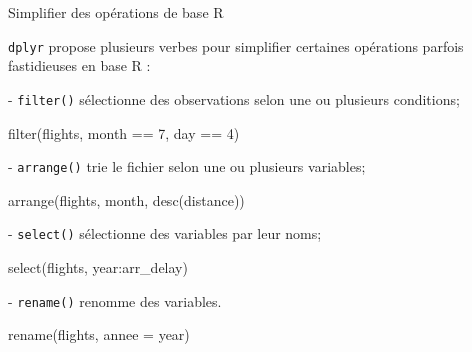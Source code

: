 \documentclass[12pt,handout,ignorenonframetext,]{beamer}
\newenvironment{Shaded}{}{}
\newcommand{\KeywordTok}[1]{\textcolor[rgb]{0.00,0.00,1.00}{{#1}}}
\newcommand{\DataTypeTok}[1]{{#1}}
\newcommand{\DecValTok}[1]{{#1}}
\newcommand{\StringTok}[1]{\textcolor[rgb]{0.00,0.50,0.50}{{#1}}}
\newcommand{\NormalTok}[1]{{#1}}
\renewenvironment{Shaded}{\begin{snugshade}}{\end{snugshade}}
\begin{document}
\begin{frame}[fragile]{Simplifier des opérations de base R}

\texttt{dplyr} propose plusieurs verbes pour simplifier certaines
opérations parfois fastidieuses en base R :

\pause \vspace{-1mm} - \texttt{filter()} sélectionne des observations
selon une ou plusieurs conditions;

\vspace{-3mm}

\begin{Shaded}
\begin{Highlighting}[]
\KeywordTok{filter}\NormalTok{(flights, month ==}\StringTok{ }\DecValTok{7}\NormalTok{, day ==}\StringTok{ }\DecValTok{4}\NormalTok{)}
\end{Highlighting}
\end{Shaded}

\pause \vspace{-3mm} - \texttt{arrange()} trie le fichier selon une ou
plusieurs variables;

\vspace{-3mm}

\begin{Shaded}
\begin{Highlighting}[]
\KeywordTok{arrange}\NormalTok{(flights, month, }\KeywordTok{desc}\NormalTok{(distance))}
\end{Highlighting}
\end{Shaded}

\pause \vspace{-3mm} - \texttt{select()} sélectionne des variables par
leur noms;

\vspace{-3mm}

\begin{Shaded}
\begin{Highlighting}[]
\KeywordTok{select}\NormalTok{(flights, year:arr_delay)}
\end{Highlighting}
\end{Shaded}

\pause \vspace{-3mm} - \texttt{rename()} renomme des variables.

\vspace{-3mm}

\begin{Shaded}
\begin{Highlighting}[]
\KeywordTok{rename}\NormalTok{(flights, }\DataTypeTok{annee =} \NormalTok{year)}
\end{Highlighting}
\end{Shaded}

\end{frame}
\end{document}
